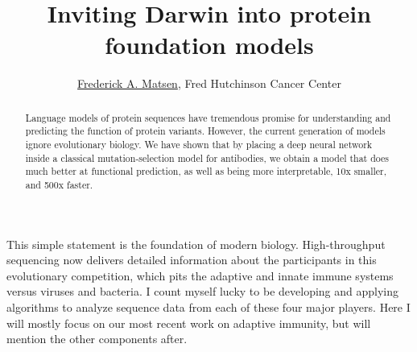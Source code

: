 \documentclass[nobib]{tufte-handout}
\title{Inviting Darwin into protein foundation models}
\author{\href{http://matsen.fredhutch.org/}{Frederick A. Matsen}, Fred Hutchinson Cancer Center}
\begin{document}
\maketitle

\begin{abstract}
\noindent
Language models of protein sequences have tremendous promise for understanding and predicting the function of protein variants.
However, the current generation of models ignore evolutionary biology.
We have shown that by placing a deep neural network inside a classical mutation-selection model for antibodies, we obtain a model that does much better at functional prediction, as well as being more interpretable, 10x smaller, and 500x faster.
\end{abstract}

This simple statement is the foundation of modern biology.
High-throughput sequencing now delivers detailed information about the participants in this evolutionary competition, which pits the adaptive and innate immune systems versus viruses and bacteria.
I count myself lucky to be developing and applying algorithms to analyze sequence data from each of these four major players.
Here I will mostly focus on our most recent work on adaptive immunity, but will mention the other components after.


\newpage


\end{document}
